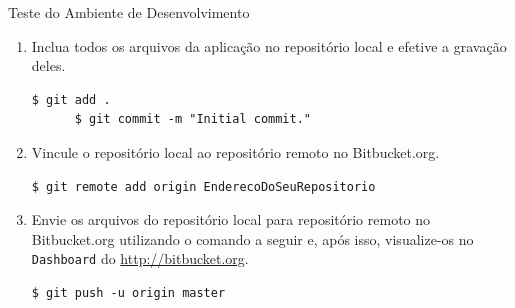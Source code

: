 \begin{frame}{Teste do Ambiente de Desenvolvimento}
\begin{enumerate}
    \item Inclua todos os arquivos da aplicação no repositório local e efetive 
      a gravação deles.
    \begin{lstlisting}[style=BashInputStyle]
	  $ git add .
	  $ git commit -m "Initial commit."
    \end{lstlisting}

    \item Vincule o repositório local ao repositório remoto no Bitbucket.org.
    \begin{lstlisting}[style=BashInputStyle]
	  $ git remote add origin EnderecoDoSeuRepositorio
    \end{lstlisting}
    
    \item Envie os arquivos do repositório local para repositório remoto no Bitbucket.org utilizando
      o comando a seguir e, após isso, visualize-os no \verb!Dashboard! do \url{http://bitbucket.org}.
    \begin{lstlisting}[style=BashInputStyle]
	  $ git push -u origin master
    \end{lstlisting}
     
  \end{enumerate}
\end{frame}
